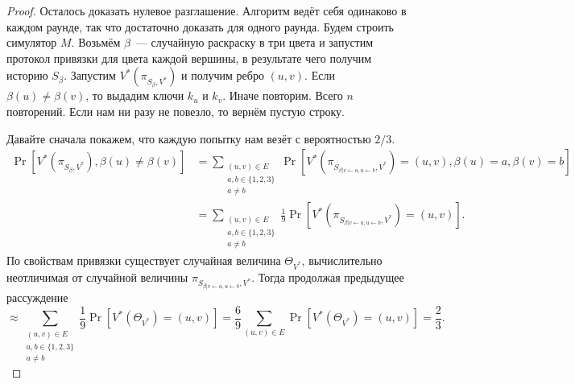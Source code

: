 \documentclass[12pt,a4paper]{article}
\theoremstyle{definition}
\theoremstyle{plain}
\theoremstyle{remark}
\begin{document}
\begin{proof}
Осталось доказать нулевое разглашение. Алгоритм ведёт себя одинаково в каждом раунде, так
что достаточно доказать для одного раунда. Будем строить симулятор $M$.
Возьмём $\beta$~--- случайную раскраску в три цвета и запустим протокол привязки
для цвета каждой вершины, в результате чего получим историю $S_\beta$.
Запустим $V^*(\pi_{S_\beta, V^*})$ и получим ребро $(u,v)$.
Если $\beta(u)\neq \beta(v)$, то выдадим ключи $k_u$ и $k_v$.
Иначе повторим. Всего $n$ повторений. Если нам ни разу не повезло, то вернём пустую строку.

Давайте сначала покажем, что каждую попытку нам везёт с вероятностью $2/3$.
\begin{align*}
\Pr[V^*(\pi_{S_\beta, V^*}), \beta(u)\neq\beta(v)] &= 
\sum_{\substack{(u,v)\in E\\a,b\in\{1,2,3\}\\a\neq b}} 
\Pr[V^*(\pi_{S_{\beta|v\gets a, u\gets b}, V^*}) = (u,v), \beta(u) = a, \beta(v) = b]\\
&=\sum_{\substack{(u,v)\in E\\a,b\in\{1,2,3\}\\a\neq b}} 
\frac{1}{9}\Pr[V^*(\pi_{S_{\beta|v\gets a, u\gets b}, V^*}) = (u,v)].
\end{align*}
По свойствам привязки существует случайная величина $\Theta_{V^*}$,
вычислительно неотличимая от случайной величины $\pi_{S_{\beta|v\gets a, u\gets b}, V^*}$.
Тогда продолжая предыдущее рассуждение
$$\approx 
\sum_{\substack{(u,v)\in E\\a,b\in\{1,2,3\}\\a\neq b}} \frac{1}{9}\Pr[V^*(\Theta_{V^*}) = (u,v)] = 
\frac{6}{9}\sum_{(u,v)\in E}\Pr[V^*(\Theta_{V^*}) = (u,v)] = \frac{2}{3}.
$$


\end{proof}
\end{document}
